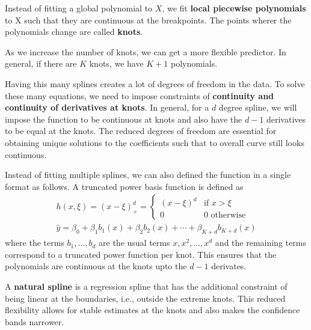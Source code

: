 \documentclass[11pt, a4paper]{article}
\begin{document}
    Instead of fitting a global polynomial to $X$, we fit \textbf{local piecewise polynomials} to X such that they are continuous at the breakpoints. The points wherer the polynomials change are called \textbf{knots}.\newline

    As we increase the number of knots, we can get a more flexible predictor. In general, if there are $K$ knots, we have $K+1$ polynomials.\newline

    Having this many splines creates a lot of degrees of freedom in the data. To solve these many equations, we need to impose constraints of \textbf{continuity and continuity of derivatives at knots}. In general, for a $d$ degree spline, we will impose the function to be continuous at knots and also have the $d-1$ derivatives to be equal at the knots. The reduced degrees of freedom are essential for obtaining unique solutions to the coefficients such that to overall curve still looks continuous.\newline

    Instead of fitting multiple splines, we can also defined the function in a single format as follows. A truncated power basis function is defined as
    \begin{align*}
        h(x, \xi) = (x - \xi)_{+}^{d} = \begin{cases} (x-\xi)^{d} &\mbox{if $x > \xi$}\\
            0 &\mbox{$0$ otherwise} \end{cases}\\
        \hat{y} = \beta_{0} + \beta_{1}b_{1}(x) + \beta_{2}b_{2}(x) + \cdots + \beta_{K+d}b_{K+d}(x)
    \end{align*}
    where the terms $b_{1},\ldots,b_{d}$ are the usual terms $x, x^{2}, \ldots, x^{d}$ and the remaining terms correspond to a truncated power function per knot. This ensures that the polynomials are continuous at the knots upto the $d-1$ derivates.\newline

    A \hypertarget{naturalsplines}{\textbf{natural spline}} is a regression spline that has the additional constraint of being linear at the boundaries, i.e., outside the extreme knots. This reduced flexibility allows for stable estimates at the knots and also makes the confidence bands narrower.

\end{document}
